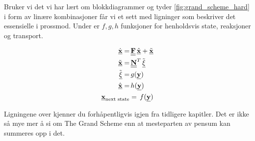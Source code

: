 Bruker vi det vi har lært om blokkdiagrammer og tyder \cref{fig:grand_scheme_hard} i form av linære kombinasjoner får vi et sett med ligninger som beskriver det essensielle i prossmod. Under er $f,g,h$ funksjoner for henholdsvis state, reaksjoner og transport. 

\begin{equation}
\label{eq:The_grand_scheme}
    \begin{split}
    \underline{\dot{\textbf{x}}} =&\, \underline{\underline{\textbf{F}}}\,\underline{\hat{\textbf{x}}} + \underline{\Tilde{\textbf{x}}} \\
    \underline{\Tilde{\textbf{x}}} =&\, \underline{\underline{\textbf{N}}}^T\,\Tilde{\underline{\xi}} \\
    \Tilde{\underline{\xi}} =&\, g(\underline{\textbf{y}}) \\
    \underline{\hat{\textbf{x}}} =&\, h(\underline{\textbf{y}}) \\
    \underline{\textbf{x}}_{\text{next state}} &=\, f(\underline{\textbf{y}}) 
    \end{split}
\end{equation}
    
Ligningene over kjenner du forhåpentligvis igjen fra tidligere kapitler. Det er ikke så mye mer å si om The Grand Scheme enn at mesteparten av pensum kan summeres opp i det. 
